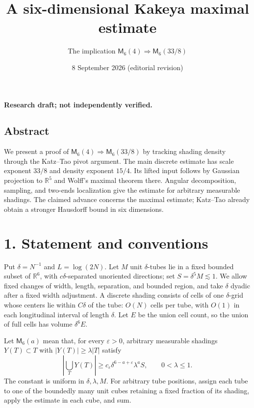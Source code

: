 \documentclass[
  11pt,
  a4paper,
]{article}
\title{A six-dimensional Kakeya maximal estimate}
\subtitle{The implication
\(\mathsf M_6(4)\Rightarrow\mathsf M_6(33/8)\)}
\author{}
\date{8 September 2026 (editorial revision)}
\makeatletter
\renewcommand{\maketitle}{%
  \begin{center}
    {\LARGE\bfseries \@title\par}
    \vspace{1em}
    {\normalsize \@date\par}
  \end{center}
  \vspace{.6em}
}
\makeatother
\begin{document}
\maketitle

\textbf{Research draft; not independently verified.}

\hypertarget{abstract}{%
\subsection{Abstract}\label{abstract}}

We present a proof of \(\mathsf M_6(4)\Rightarrow\mathsf M_6(33/8)\) by
tracking shading density through the Katz--Tao pivot argument. The main
discrete estimate has scale exponent \(33/8\) and density exponent
\(15/4\). Its lifted input follows by Gaussian projection to
\(\mathbb R^5\) and Wolff's maximal theorem there. Angular
decomposition, sampling, and two-ends localization give the estimate for
arbitrary measurable shadings. The claimed advance concerns the maximal
estimate; Katz--Tao already obtain a stronger Hausdorff bound in six
dimensions.

\hypertarget{statement-and-conventions}{%
\section{1. Statement and conventions}\label{statement-and-conventions}}

Put \(\delta=N^{-1}\) and \(L=\log(2N)\). Let \(M\) unit
\(\delta\)-tubes lie in a fixed bounded subset of \(\mathbb R^6\), with
\(c\delta\)-separated unoriented directions; set
\(S=\delta^5M\lesssim1\). We allow fixed changes of width, length,
separation, and bounded region, and take \(\delta\) dyadic after a fixed
width adjustment. A discrete shading consists of cells of one
\(\delta\)-grid whose centers lie within \(C\delta\) of the tube:
\(O(N)\) cells per tube, with \(O(1)\) in each longitudinal interval of
length \(\delta\). Let \(E\) be the union cell count, so the union of
full cells has volume \(\delta^6E\).

Let \(\mathsf M_6(a)\) mean that, for every \(\varepsilon>0\), arbitrary
measurable shadings \(Y(T)\subset T\) with \(|Y(T)|\ge\lambda|T|\)
satisfy \[
 \left|\bigcup_TY(T)\right|
 \ge c_\varepsilon\delta^{6-a+\varepsilon}\lambda^aS,
 \qquad 0<\lambda\le1.
\tag{1}\label{eq:1}
\] The constant is uniform in \(\delta,\lambda,M\). For arbitrary tube
positions, assign each tube to one of the boundedly many unit cubes
retaining a fixed fraction of its shading, apply the estimate in each
cube, and sum.
\end{document}
